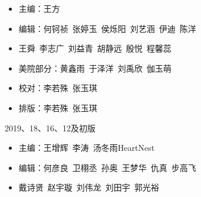 \begin{titlepage}
\begin{itemize}
\item[] 主\qquad 编：王\quad 方
\item[] 编\qquad 辑：何钶祯\, 张婷玉\, 侯烁阳\, 刘艺涵\, 伊\quad 迪\, 陈\quad 洋
\item[] \hspace*{2.1cm}王\quad 舜\, 李志广\, 刘益青\, 胡静远\, 殷\quad 悦\, 程馨蕊
\item[] 美院部分：黄鑫雨\, 于泽洋\, 刘禹欣\, 伽玉萌
\item[] 校\qquad 对：李若殊\, 张玉琪
\item[] 排\qquad 版：李若殊\, 张玉琪
\end{itemize}
\vspace{2cm}\centerline{2019、18、16、12及初版} 
\begin{itemize}

\item[] 主\qquad 编：王增辉\, 李\quad 涛\, 汤冬雨\hspace{0.3cm}HeartNest
\item[] 编\qquad 辑：何彦良\, 卫栩丞\, 孙\quad 奥\, 王梦华\, 仇\quad 真\, 步高飞
\item[] \hspace*{2.1cm}戴诗贤\, 赵宇璇\, 刘伟龙\, 刘田宇\, 郭光裕


\end{itemize}



\clearpage{\pagestyle{empty}\cleardoublepage}%
\end{titlepage}


\clearpage{\pagestyle{empty}\cleardoublepage}

{
\hypersetup{linkcolor=black}
\tableofcontents                        %

}
\clearpage{\pagestyle{empty}\cleardoublepage}

